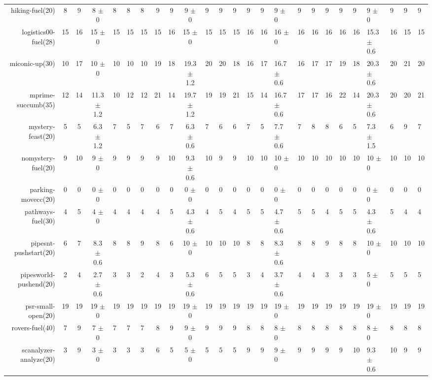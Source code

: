 \begin{center}
\begin{tabular}{|rcccHHH|cccHHHHHHHHHHHHHHH|}
hiking-fuel(20) & 8 & 9 & 8 $\pm$ 0 & 8 & 8 & 8 & 9 & 9 & 9 $\pm$ 0 & 9 & 9 & 9 & 9 & 9 & 9 $\pm$ 0 & 9 & 9 & 9 & 9 & 9 & 9 $\pm$ 0 & 9 & 9 & 9\\
logistics00-fuel(28) & 15 & 16 & 15 $\pm$ 0 & 15 & 15 & 15 & 15 & 16 & 15 $\pm$ 0 & 15 & 15 & 15 & 16 & 16 & 16 $\pm$ 0 & 16 & 16 & 16 & 16 & 16 & 15.3 $\pm$ 0.6 & 16 & 15 & 15\\
miconic-up(30) & 10 & 17 & 10 $\pm$ 0 & 10 & 10 & 10 & 19 & 18 & 19.3 $\pm$ 1.2 & 20 & 20 & 18 & 16 & 17 & 16.7 $\pm$ 0.6 & 16 & 17 & 17 & 19 & 18 & 20.3 $\pm$ 0.6 & 20 & 21 & 20\\
mprime-succumb(35) & 12 & 14 & 11.3 $\pm$ 1.2 & 10 & 12 & 12 & 21 & 14 & 19.7 $\pm$ 1.2 & 19 & 19 & 21 & 15 & 14 & 16.7 $\pm$ 0.6 & 17 & 17 & 16 & 22 & 14 & 20.3 $\pm$ 0.6 & 20 & 20 & 21\\
mystery-feast(20) & 5 & 5 & 6.3 $\pm$ 1.2 & 7 & 5 & 7 & 6 & 7 & 6.3 $\pm$ 0.6 & 7 & 6 & 6 & 7 & 5 & 7.7 $\pm$ 0.6 & 7 & 8 & 8 & 6 & 5 & 7.3 $\pm$ 1.5 & 6 & 9 & 7\\
nomystery-fuel(20) & 9 & 10 & 9 $\pm$ 0 & 9 & 9 & 9 & 9 & 10 & 9.3 $\pm$ 0.6 & 10 & 9 & 9 & 10 & 10 & 10 $\pm$ 0 & 10 & 10 & 10 & 10 & 10 & 10 $\pm$ 0 & 10 & 10 & 10\\
parking-movecc(20) & 0 & 0 & 0 $\pm$ 0 & 0 & 0 & 0 & 0 & 0 & 0 $\pm$ 0 & 0 & 0 & 0 & 0 & 0 & 0 $\pm$ 0 & 0 & 0 & 0 & 0 & 0 & 0 $\pm$ 0 & 0 & 0 & 0\\
pathways-fuel(30) & 4 & 5 & 4 $\pm$ 0 & 4 & 4 & 4 & 4 & 5 & 4.3 $\pm$ 0.6 & 4 & 5 & 4 & 5 & 5 & 4.7 $\pm$ 0.6 & 5 & 5 & 4 & 5 & 5 & 4.3 $\pm$ 0.6 & 5 & 4 & 4\\
pipesnt-pushstart(20) & 6 & 7 & 8.3 $\pm$ 0.6 & 8 & 8 & 9 & 8 & 6 & 10 $\pm$ 0 & 10 & 10 & 10 & 8 & 8 & 8.3 $\pm$ 0.6 & 8 & 8 & 9 & 8 & 8 & 10 $\pm$ 0 & 10 & 10 & 10\\
pipesworld-pushend(20) & 2 & 4 & 2.7 $\pm$ 0.6 & 3 & 3 & 2 & 4 & 3 & 5.3 $\pm$ 0.6 & 6 & 5 & 5 & 3 & 4 & 3.7 $\pm$ 0.6 & 4 & 4 & 3 & 3 & 3 & 5 $\pm$ 0 & 5 & 5 & 5\\
psr-small-open(20) & 19 & 19 & 19 $\pm$ 0 & 19 & 19 & 19 & 19 & 19 & 19 $\pm$ 0 & 19 & 19 & 19 & 19 & 19 & 19 $\pm$ 0 & 19 & 19 & 19 & 19 & 19 & 19 $\pm$ 0 & 19 & 19 & 19\\
rovers-fuel(40) & 7 & 9 & 7 $\pm$ 0 & 7 & 7 & 7 & 8 & 9 & 9 $\pm$ 0 & 9 & 9 & 9 & 8 & 8 & 8 $\pm$ 0 & 8 & 8 & 8 & 8 & 8 & 8 $\pm$ 0 & 8 & 8 & 8\\
scanalyzer-analyze(20) & 3 & 9 & 3 $\pm$ 0 & 3 & 3 & 3 & 6 & 5 & 5 $\pm$ 0 & 5 & 5 & 5 & 9 & 9 & 9 $\pm$ 0 & 9 & 9 & 9 & 9 & 10 & 9.3 $\pm$ 0.6 & 10 & 9 & 9\\

\end{tabular}
\end{center}
